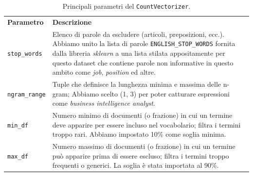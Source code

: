 \begin{table}[H]
\centering
\begin{tabular}{p{3cm} p{9cm}}
\textbf{Parametro} & \textbf{Descrizione} \\
\texttt{stop\_words} & Elenco di parole da escludere (articoli, preposizioni, ecc.). Abbiamo unito la lista di parole \texttt{ENGLISH\_STOP\_WORDS} fornita dalla libreria \textit{sklearn} a una lista stilata appositamente per questo dataset che contiene parole non informative in questo ambito come \textit{job}, \textit{position} ed altre. \\
\texttt{ngram\_range} & Tuple che definisce la lunghezza minima e massima delle n-gram; Abbiamo scelto (1, 3) per poter catturare espressioni come \textit{business intelligence analyst}. \\
\texttt{min\_df} & Numero minimo di documenti (o frazione) in cui un termine deve apparire per essere incluso nel vocabolario; filtra i termini troppo rari. Abbiamo impostato 10\% come soglia minima. \\
\texttt{max\_df} & Numero massimo di documenti (o frazione) in cui un termine può apparire prima di essere escluso; filtra i termini troppo frequenti o generici. La soglia è stata importata al 90\%. \\
\end{tabular}
\caption{Principali parametri del \texttt{CountVectorizer}.}
\end{table}
